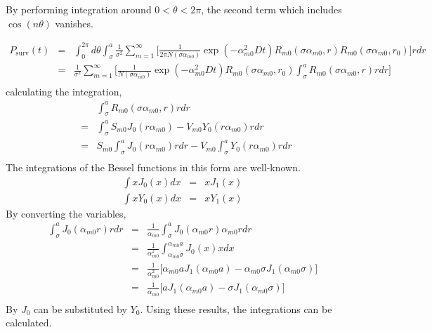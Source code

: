 \documentclass{article}
\begin{document}
By performing integration around $0 < \theta < 2\pi$, the second term which
includes $\cos(n\theta)$ vanishes.

\begin{eqnarray}
    P_{\mathrm{surv}}(t)
        &=& \int_0^{2\pi}d\theta \int_\sigma^a \frac{1}{\sigma^2} \sum_{m=1}^{\infty} \Bigg[
            \frac{1}{2\pi N(\sigma\alpha_{m0})} \exp(-\alpha_{m0}^2Dt)
            R_{m0}(\sigma\alpha_{m0}, r) R_{m0}(\sigma\alpha_{m0}, r_0)
            \Bigg] rdr \nonumber\\
        &=& \frac{1}{\sigma^2} \sum_{m=1}^{\infty} \Bigg[
            \frac{1}{N(\sigma\alpha_{m0})} \exp(-\alpha_{m0}^2Dt)
            R_{m0}(\sigma\alpha_{m0}, r_0)
            \int_\sigma^a R_{m0}(\sigma\alpha_{m0}, r) rdr \Bigg] \nonumber\\
\end{eqnarray}
%
calculating the integration,
%
\begin{eqnarray}
    & & \int_\sigma^a R_{m0}(\sigma\alpha_{m0}, r) rdr \nonumber\\
    &=& \int_\sigma^a S_{m0}J_0(r\alpha_{m0}) - V_{m0}Y_0(r\alpha_{m0}) rdr \nonumber\\
    &=& S_{m0} \int_\sigma^a J_0(r\alpha_{m0}) rdr -
        V_{m0} \int_\sigma^a Y_0(r\alpha_{m0}) rdr \nonumber\\
%
\end{eqnarray}
%
The integrations of the Bessel functions in this form are well-known.
%
\begin{eqnarray}
    \int xJ_0(x) dx &=& xJ_1(x)\\
    \int xY_0(x) dx &=& xY_1(x)
\end{eqnarray}
%
By converting the variables,
%
\begin{eqnarray}
    \int_\sigma^a J_0(\alpha_{m0}r) rdr
    &=& \frac{1}{\alpha_{m0}}  \int_\sigma^a J_0(\alpha_{m0}r) \alpha_{m0}r dr \\
    &=& \frac{1}{\alpha_{m0}^2}\int_{\alpha_{m0}\sigma}^{\alpha_{m0}a} J_0(x) x dx \\
    &=& \frac{1}{\alpha_{m0}^2}\Big[\alpha_{m0}a J_1(\alpha_{m0}a) - \alpha_{m0}\sigma J_1(\alpha_{m0}\sigma) \Big] \\
    &=& \frac{1}{\alpha_{m0}}  \Big[aJ_1(\alpha_{m0}a) - \sigma J_1(\alpha_{m0}\sigma) \Big] \\
\end{eqnarray}
%
By $J_0$ can be substituted by $Y_0$.
Using these results, the integrations can be calculated.
%
\end{document}
